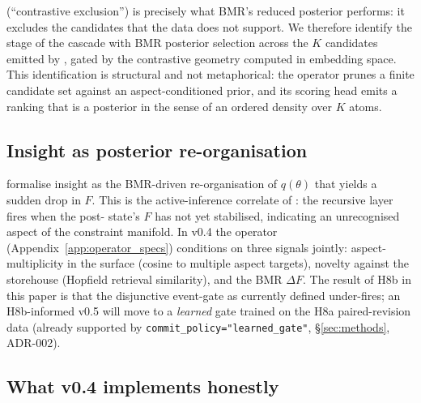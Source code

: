  (``contrastive exclusion'') is precisely what BMR's reduced posterior performs: it excludes the candidates that the data does not support. We therefore identify the  stage of the cascade with BMR posterior selection across the $K$ candidates emitted by , gated by the  contrastive geometry computed in embedding space. This identification is structural and not metaphorical: the operator prunes a finite candidate set against an aspect-conditioned prior, and its scoring head emits a ranking that is a posterior in the sense of an ordered density over $K$ atoms.

\subsection{Insight as posterior re-organisation}

\citet{Friston2017ActiveInferenceCuriosity} formalise insight as the BMR-driven re-organisation of $q(\theta)$ that yields a sudden drop in $F$. This is the active-inference correlate of : the recursive layer fires when the post- state's $F$ has not yet stabilised, indicating an unrecognised aspect of the constraint manifold. In v0.4 the  operator (Appendix~\ref{app:operator_specs}) conditions on three signals jointly: aspect-multiplicity in the surface (cosine to multiple aspect targets), novelty against the storehouse (Hopfield retrieval similarity), and the BMR $\Delta F$. The result of H8b in this paper is that the disjunctive event-gate as currently defined under-fires; an H8b-informed v0.5 will move to a \emph{learned} gate trained on the H8a paired-revision data (already supported by \texttt{commit\_policy="learned\_gate"}, \S\ref{sec:methods}, ADR-002).

\subsection{What v0.4 implements honestly}


